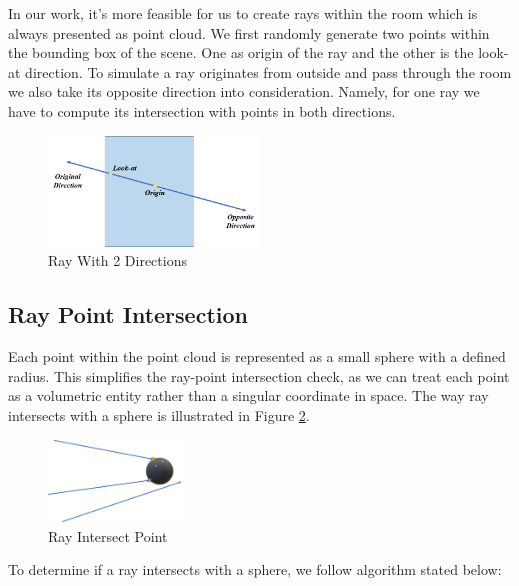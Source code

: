 \documentclass[11pt, a4paper,oneside,chapterprefix=false]{scrbook}
\begin{document}
\vspace{10pt}

In our work, it's more feasible for us to create rays within the room which is always presented as point cloud. We first randomly generate two points within the bounding box of the scene. One as origin of the ray and the other is the look-at direction. To simulate a ray originates from outside and pass through the room we also take its opposite direction into consideration. Namely, for one ray we have to compute its intersection with points in both directions. 

\begin{figure}[H]
    \centering
    \includegraphics*[width=0.5\textwidth]{figures/ray with two directions.png}
    \caption{Ray With 2 Directions}
    \label{fig:ray with 2 directions}
\end{figure}

\subsection{Ray Point Intersection} \label{ray point intersection}

Each point within the point cloud is represented as a small sphere with a defined radius. This simplifies the ray-point intersection check, as we can treat each point as a volumetric entity rather than a singular coordinate in space. The way ray intersects with a sphere is illustrated in Figure \ref{fig:ray intersect point}. 

\begin{figure}[H]
    \centering
    \includegraphics*[width=0.32\textwidth]{figures/ray intersect point.png}
    \caption{Ray Intersect Point}
    \label{fig:ray intersect point}
\end{figure}

To determine if a ray intersects with a sphere, we follow algorithm stated below:
\end{document}
